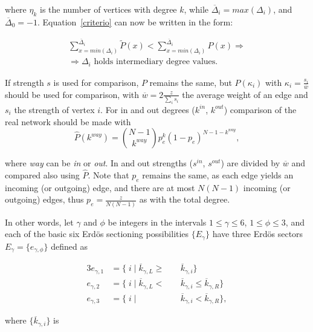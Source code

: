 \documentclass[%
	aip,
	jmp,%
	amsmath,amssymb,
	reprint,%
]{revtex4-1}
\begin{document}
\noindent where $\eta_k$ is the number of vertices with degree $k$, while $\overline{\Delta}_{i}=max(\Delta_{i})$, and $\overline{\Delta}_{0}=-1$. Equation~\ref{criterio} can now be written in the form:

\begin{equation}\label{criterio2}
	\begin{split}
		\sum_{x=min(\Delta_i)}^{\overline{\Delta}_i} \widetilde{P}(x) < \sum_{x=min(\Delta_i)}^{\overline{\Delta}_i} P(x) \Rightarrow \\
	\Rightarrow \Delta_i \text{ holds intermediary degree values.}
	\end{split}
\end{equation}

If strength $s$ is used for comparison, $P$ remains the same, but $P(\kappa_i)$ with $\kappa_i=\frac{s_i}{\overline{w}}$ should be used for comparison, with $\overline{w}=2\frac{z}{\sum_is_i}$ the average weight of an edge and $s_i$ the strength of vertex $i$. For in and out degrees ($k^{in}$, $k^{out}$) comparison of the real network should be made with
\begin{equation}
	\hat{P}(k^{way})=\binom{N-1}{k^{way}}p_e^k(1-p_e)^{N-1-k^{way}},
\end{equation}

\noindent where \emph{way} can be \emph{in} or \emph{out}. In and out strengths ($s^{in}$, $s^{out}$) are divided by $\overline{w}$ and compared also using $\hat{P}$. Note that $p_e$ remains the same, as each edge yields an incoming (or outgoing) edge, and there are at most $N(N-1)$ incoming (or outgoing) edges, thus $p_e=\frac{z}{N(N-1)}$ as with the total degree.

In other words, let $\gamma$ and $\phi$ be integers in the intervals $1 \leq \gamma \leq 6$, $1 \leq \phi \leq 3$, and each of the basic six Erd\"os sectioning possibilities $\{E_{\gamma}\}$ have three Erd\"os sectors $E_{\gamma}= \{e_{\gamma, \phi} \}$ defined as

\begin{alignat}{3}\label{eq:part}
	e_{\gamma,1}&=\{\;i\;|\;\overline{k}_{\gamma,L}\geq&&\overline{k}_{\gamma,i}\} \nonumber \\
	e_{\gamma,2}&=\{\;i\;|\;\overline{k}_{\gamma,L}<\;&&\overline{k}_{\gamma,i}\leq\overline{k}_{\gamma,R}\} \\ 
	e_{\gamma,3}&=\{\;i\;|\;&&\overline{k}_{\gamma,i}<\overline{k}_{\gamma,R}\} \nonumber,
\end{alignat}

\noindent where $\{\overline{k}_{\gamma,i}\}$ is
\end{document}
